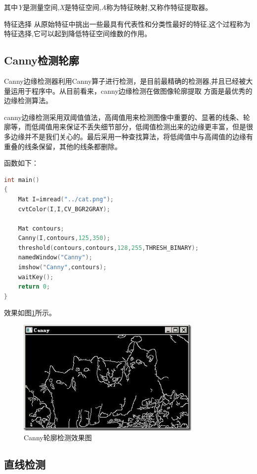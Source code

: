 \documentclass{XDBAthesis}
\begin{document}
其中\emph{Y}是测量空间,\emph{X}是特征空间,\emph{A}称为特征映射,又称作特征提取器。

     特征选择  从原始特征中挑出一些最具有代表性和分类性最好的特征,这个过程称为特征选择,它可以起到降低特征空间维数的作用。

\subsection{Canny检测轮廓}

Canny边缘检测器利用Canny算子进行检测，是目前最精确的检测器,并且已经被大量运用于程序中。从目前看来，canny边缘检测在做图像轮廓提取 方面是最优秀的边缘检测算法。

canny边缘检测采用双阈值值法，高阈值用来检测图像中重要的、显著的线条、轮廓等，而低阈值用来保证不丢失细节部分，低阈值检测出来的边缘更丰富，但是很多边缘并不是我们关心的。最后采用一种查找算法，将低阈值中与高阈值的边缘有重叠的线条保留，其他的线条都删除。

函数如下：
\begin{lstlisting}[language=C]
int main() 
{ 
    Mat I=imread("../cat.png"); 
    cvtColor(I,I,CV_BGR2GRAY); 
                                                 
    Mat contours; 
    Canny(I,contours,125,350); 
    threshold(contours,contours,128,255,THRESH_BINARY); 
    namedWindow("Canny"); 
    imshow("Canny",contours); 
    waitKey(); 
    return 0; 
} 
\end{lstlisting}
效果如图\ref{fg:Canny}所示。
\begin{figure}[htb]
    \centering
    \includegraphics[width=0.8\textwidth ]{figure/cat}
    \caption{Canny轮廓检测效果图}
    \label{fg:Canny}
\end{figure}


\subsection{直线检测}
\end{document}
